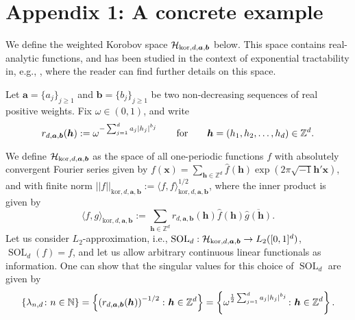 \documentclass[sort&compress]{elsarticle}
\newcommand{\bsa}{\boldsymbol{a}}
\newcommand{\bsb}{\boldsymbol{b}}
\newcommand{\bsh}{\boldsymbol{h}}
\newcommand{\bsx}{\boldsymbol{x}}
\newcommand{\kor}{{\mathrm{kor}}}
\newcommand{\ZZ}{{\mathbb{Z}}}
\newcommand{\NN}{{\mathbb{N}}}
\DeclareMathOperator{\SOL}{SOL}
\newcommand{\fred}[1]{\begingroup\color{blue}#1\endgroup}
\begin{document}
\section*{Appendix 1: A concrete example}


We define the weighted Korobov space $\ch_{\kor,d,\bsa,\bsb}$ below. 
This space contains real-analytic functions, and has been studied in the context of exponential tractability in, e.g., \cite{DKPW14, KPW17}, where the reader can find further details on this space.

Let $\bsa=\{a_j\}_{j \ge 1}$ and
$\bsb=\{b_j\}_{j \ge 1}$ be two non-decreasing sequences of real positive weights.
Fix $\omega\in(0,1)$, and write 
\[
r_{d,\bsa,\bsb} (\bsh):=\omega^{-\sum_{j=1}^{d}a_j \abs{h_j}^{b_j}}
\qquad\mbox{for}\qquad \bsh=(h_1,h_2,\dots,h_d)\in\ZZ^d.
\]

We define $\ch_{\kor,d,\bsa,\bsb}$ as the space of all one-periodic functions $f$ with absolutely convergent Fourier series given by $f(\bsx) = \sum_{\bsh \in \ZZ^d} \widehat{f}(\bsh) \exp(2 \pi \sqrt{-1}\bsh'\bsx)$, 
and with finite norm 
$||f||_{\kor,d,\bsa,\bsb}:=\langle f, f\rangle_{\kor,d,\bsa,\bsb}^{1/2}$,
where the inner product is given by
\[
 \langle f, g\rangle_{\kor,d,\bsa,\bsb}:=
 \sum_{\bsh\in\ZZ^d} r_{d,\bsa,\bsb} (\bsh) 
 \widehat{f} (\bsh) \overline{\widehat{g}(\bsh)}.
\]
Let us consider $L_2$-approximation, i.e., $\SOL_d:\ch_{\kor,d,\bsa,\bsb}\to L_2([0,1]^d)$, $\SOL_d(f)=f$, and let us allow arbitrary continuous linear functionals as information. One can show that the singular values  for this choice of $\SOL_d$ are given by
\begin{equation}\label{eq:eigenvalues}
 \left\{\lambda_{n,d}\colon n\in\NN\right\}=\left\{\left(r_{d,\bsa,\bsb} (\bsh)\right)^{-1/2}\colon \bsh\in\ZZ^d\right\}
 =\left\{\omega^{\frac{1}{2}\sum_{j=1}^{d}a_j \abs{h_j}^{b_j}}\colon \bsh\in\ZZ^d\right\}.
\end{equation}
\end{document}
